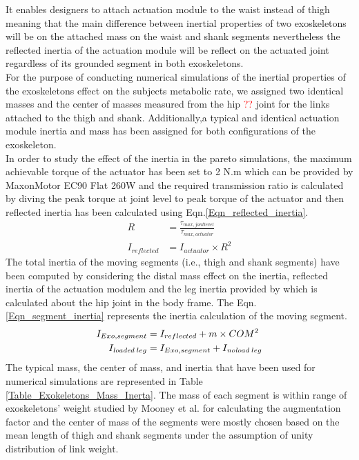 \documentclass[10pt,letterpaper]{article}
\begin{document}
It enables designers to attach actuation module to the waist instead of thigh meaning that the main difference between inertial properties of two exoskeletons will be on the attached mass on the waist and shank segments nevertheless the reflected inertia of the actuation module will be reflect on the actuated joint regardless of its grounded segment in both exoskeletons.\\
For the purpose of conducting numerical simulations of the inertial properties of the exoskeletons effect on the subjects metabolic rate, we assigned two identical masses and the center of masses measured from the hip \textcolor{red}{??} joint for the links attached to the thigh and shank. Additionally,a typical and identical actuation module inertia and mass has been assigned for both configurations of the exoskeleton.\\
In order to study the effect of the inertia in the pareto simulations, the maximum achievable torque of the actuator has been set to 2 N.m which can be provided by MaxonMotor EC90 Flat 260W and the required transmission ratio is calculated by diving the peak torque at joint level to peak torque of the actuator and then reflected inertia has been calculated using Eqn.\eqref{Eqn_reflected_inertia}.\\
\begin{equation}\label{Eqn_reflected_inertia}
\begin{aligned}
R &= \frac{\tau_{max,jont level}}{\tau_{max,actuator}}\\
I_{reflected} &= I_{actuator}\times R^{2}
\end{aligned}
\end{equation}
The total inertia of the moving segments (i.e., thigh and shank segments) have been computed by considering the distal mass effect on the inertia, reflected inertia of the actuation modulem and the leg inertia provided by \cite{133} which is calculated about the hip joint in the body frame. The Eqn.\eqref{Eqn_segment_inertia} represents the inertia calculation of the moving segment.
\begin{equation}\label{Eqn_segment_inertia}
\begin{aligned}
I_{Exo,segment} &= I_{reflected} + m\times COM^{2}\\
I_{\textit{loaded}\;leg} &= I_{Exo,segment} + I_{\textit{\textit{noload}}\;leg}
\end{aligned}
\end{equation}
The typical mass, the center of mass, and inertia that have been used for numerical simulations are represented in Table \ref{Table_Exokeletons_Mass_Inerta}. The mass of each segment is within range of exoskeletons' weight studied by Mooney et al.\cite{41} for calculating the augmentation factor and the center of mass of the segments were mostly chosen based on the mean length of thigh and shank segments\cite{136} under the assumption of unity distribution of link weight.\\ 
\end{document}
